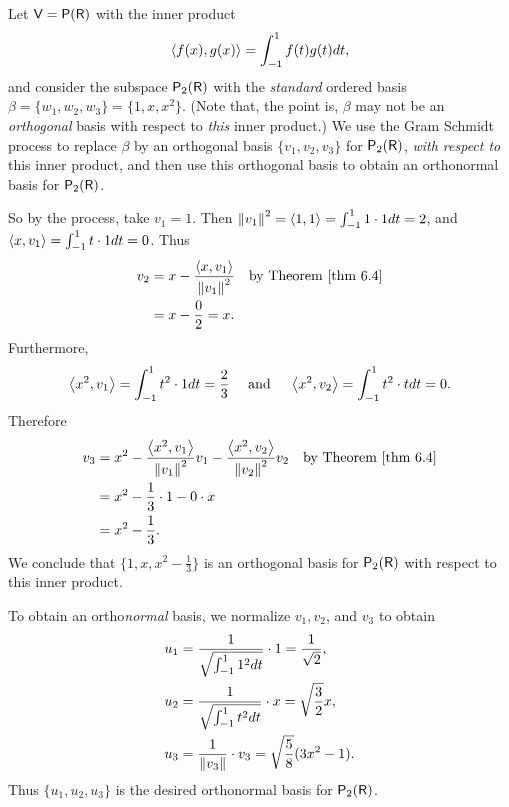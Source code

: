 \begin{example} \label{example 6.2.5}
Let \(\textsf{V} = \textsf{P}(\textsf{R})\) with the inner product
\[
    \left< f(x), g(x) \right> = \int_{-1}^{1} f(t)g(t) dt,
\]
and consider the subspace \(\textsf{P}_2(\textsf{R})\) with the \emph{standard} ordered basis \(\beta = \{ w_1, w_2, w_3 \} = \{ 1, x, x^2 \}\).
(Note that, the point is, \(\beta\) may not be an \emph{orthogonal} basis with respect to \emph{this} inner product.)
We use the Gram Schmidt process to replace \(\beta\) by an orthogonal basis \(\{v_1, v_2, v_3 \}\) for \(\textsf{P}_2(\textsf{R})\), \emph{with respect to} this inner product, and then use this orthogonal basis to obtain an orthonormal basis for \(\textsf{P}_2(\textsf{R})\).

So by the process, take \(v_1 = 1\).
Then \(\left\lVert v_1\right\rVert^2 = \left< 1, 1 \right> = \int_{-1}^1 1 \cdot 1 dt = 2\), and \(\left< x, v_1 \right> = \int_{-1}^1 t \cdot 1 dt = 0\).
Thus
\begin{align*}
    v_2 & = x - \frac{\LG x, v_1 \RG}{\norm{v_1}^2} & \text{by \THM{6.4}} \\
        & = x - \frac{0}{2} = x.
\end{align*}
Furthermore,
\[
    \left< x^2, v_1 \right> = \int_{-1}^1 t^2 \cdot 1 dt = \frac{2}{3} \quad \text{ and } \quad \left< x^2, v_2 \right> = \int_{-1}^1 t^2 \cdot t dt = 0.
\]
Therefore
\begin{align*}
    v_3 & = x^2 - \frac{\LG x^2, v_1 \RG}{\norm{v_1}^2} v_1 - \frac{\LG x^2, v_2 \RG}{\norm{v_2}^2} v_2 & \text{by \THM{6.4}} \\
        & = x^2 - \frac{1}{3} \cdot 1 - 0 \cdot x \\
        & = x^2 - \frac{1}{3}.
\end{align*}
We conclude that \(\{ 1, x, x^2 - \frac{1}{3} \}\) is an orthogonal basis for \(\textsf{P}_2(\textsf{R})\) with respect to this inner product.

To obtain an ortho\emph{normal} basis, we normalize \(v_1, v_2\), and \(v_3\) to obtain
\begin{align*}
    u_1 & = \frac{1}{\sqrt{\int_{-1}^1 1^2 dt}} \cdot 1 = \frac{1}{\sqrt{2}}, \\
    u_2 & = \frac{1}{\sqrt{\int_{-1}^1 t^2 dt}} \cdot x = \sqrt{\frac{3}{2}} x, \\
    u_3 & = \frac{1}{\left\lVert v_3\right\rVert} \cdot v_3 = \sqrt{\frac{5}{8}}(3x^2 - 1).
\end{align*}
Thus \(\{ u_1, u_2, u_3 \}\) is the desired orthonormal basis for \(\textsf{P}_2(\textsf{R})\).
\end{example}

